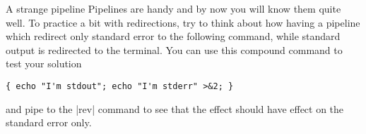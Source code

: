
\begin{exercise}[Black]{A strange pipeline}
    Pipelines are handy and by now you will know them quite well.
    To practice a bit with redirections, try to think about how having a pipeline which redirect only standard error to the following command, while standard output is redirected to the terminal.
    You can use this compound command to test your solution
    \begin{lstlisting}[style=MyBash]
        { echo "I'm stdout"; echo "I'm stderr" >&2; }
    \end{lstlisting}
    and pipe to the \bash|rev| command to see that the effect should have effect on the standard error only.
\end{exercise}

